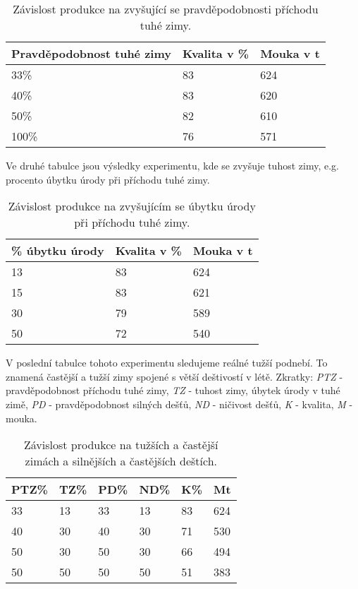 \documentclass[a4paper, 11pt, hidelinks]{article}
\begin{document}
\begin{table}[ht]
    \centering
    \begin{tabularx}{\textwidth}{|p{}|X|X|}
        \hline
        \textbf{Pravděpodobnost tuhé zimy} & \textbf{Kvalita v \%} & \textbf{Mouka v t} \\
        \hline
        33\% & 83 & 624 \\
        \hline
        40\% & 83 & 620 \\
        \hline
        50\% & 82 &  610 \\
        \hline
        100\% & 76 & 571 \\
        \hline
    \end{tabularx}
    \caption{Závislost produkce na zvyšující se pravděpodobnosti příchodu tuhé zimy.}
    \label{tab:zima_casto}
\end{table}

\newpage
Ve druhé tabulce jsou výsledky experimentu, kde se zvyšuje tuhost zimy, e.g. procento úbytku úrody při příchodu tuhé zimy. 

\begin{table}[ht]
    \centering
    \begin{tabularx}{\textwidth}{|X|X|X|}
      \hline
      \textbf{\% úbytku úrody} & \textbf{Kvalita v \%} & \textbf{Mouka v t} \\
      \hline
      13 & 83 & 624 \\
      \hline
      15 & 83 & 621 \\
      \hline
      30 & 79 & 589 \\
      \hline
      50 & 72 & 540 \\
      \hline
    \end{tabularx}
    \caption{Závislost produkce na zvyšujícím se úbytku úrody při příchodu tuhé zimy.}
    \label{tab:zima_ubytek}
\end{table}
  
V poslední tabulce tohoto experimentu sledujeme reálné tužší podnebí.
To znamená častější a tužší zimy spojené s větší deštivostí v létě.
Zkratky: \emph{PTZ} - pravděpodobnost příchodu tuhé zimy, \emph{TZ} - tuhost zimy, úbytek úrody v tuhé zimě,
\emph{PD} - pravděpodobnost silných dešťů, \emph{ND} - ničivost dešťů, \emph{K} - kvalita, \emph{M} - mouka.

\begin{table}[ht]
    \centering
    \begin{tabularx}{\textwidth}{|X|X|X|X|X|X|}
      \hline
      \textbf{PTZ\%} & \textbf{TZ\%} & \textbf{PD\%} & \textbf{ND\%} & \textbf{K\%}  & \textbf{Mt} \\
      \hline
      33 & 13 & 33 & 13 & 83 & 624\\
      \hline
      40 & 30 & 40 & 30 & 71 & 530\\
      \hline
      50 & 30 & 50 & 30 & 66 & 494\\
      \hline
      50 & 50 & 50 & 50 & 51 & 383\\
      \hline
    \end{tabularx}
    \caption{Závislost produkce na tužších a častější zimách a silnějších a častějších deštích.}
    \label{tab:example}
\end{table}
\end{document}
